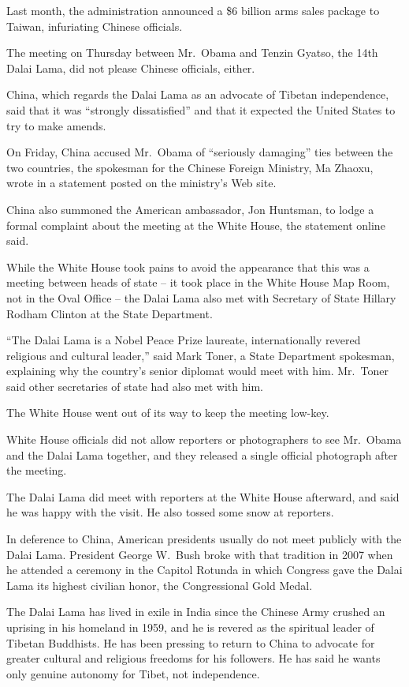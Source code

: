 ﻿\documentclass[12pt]{article}
\begin{document}
Last month, the administration announced a \$6 billion arms sales package to Taiwan, infuriating
Chinese officials.

The meeting on Thursday between Mr.~Obama and Tenzin Gyatso, the 14th Dalai Lama, did not please
Chinese officials, either.

China, which regards the Dalai Lama as an advocate of Tibetan independence, said that it was
``strongly dissatisfied'' and that it expected the United States to try to make amends.

On Friday, China accused Mr.~Obama of ``seriously damaging'' ties between the two countries, the
spokesman for the Chinese Foreign Ministry, Ma Zhaoxu, wrote in a statement posted on the ministry's
Web site.

China also summoned the American ambassador, Jon Huntsman, to lodge a formal complaint about the
meeting at the White House, the statement online said.

While the White House took pains to avoid the appearance that this was a meeting between heads of
state -- it took place in the White House Map Room, not in the Oval Office -- the Dalai Lama also
met with Secretary of State Hillary Rodham Clinton at the State Department.

``The Dalai Lama is a Nobel Peace Prize laureate, internationally revered religious and cultural
leader,'' said Mark Toner, a State Department spokesman, explaining why the country's senior
diplomat would meet with him. Mr.~Toner said other secretaries of state had also met with him.

The White House went out of its way to keep the meeting low-key.

White House officials did not allow reporters or photographers to see Mr.~Obama and the Dalai Lama
together, and they released a single official photograph after the meeting.

The Dalai Lama did meet with reporters at the White House afterward, and said he was happy with the
visit. He also tossed some snow at reporters.

In deference to China, American presidents usually do not meet publicly with the Dalai Lama.
President George W.~Bush broke with that tradition in 2007 when he attended a ceremony in the
Capitol Rotunda in which Congress gave the Dalai Lama its highest civilian honor, the Congressional
Gold Medal.

The Dalai Lama has lived in exile in India since the Chinese Army crushed an uprising in his
homeland in 1959, and he is revered as the spiritual leader of Tibetan Buddhists. He has been
pressing to return to China to advocate for greater cultural and religious freedoms for his
followers. He has said he wants only genuine autonomy for Tibet, not independence.
\end{document}
